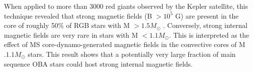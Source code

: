 When applied to more than 3000 red giants observed by the Kepler satellite, this technique revealed that
strong magnetic fields (B $> 10^5$ G) are present in the core of roughly 50\% of RGB stars with M $> 1.5M_\odot$ \citep{Stello_2016,Stello_2016a}\cite{Stello_2016a} .
Conversely, strong internal magnetic fields are very rare in stars with M $< 1.1M_\odot$. This is interpreted as the
effect of MS core-dynamo-generated magnetic fields in the convective cores of M $. 1.1M_\odot$ stars.
This result shows that a potentially very large fraction of main sequence OBA stars could host strong internal magnetic fields.



